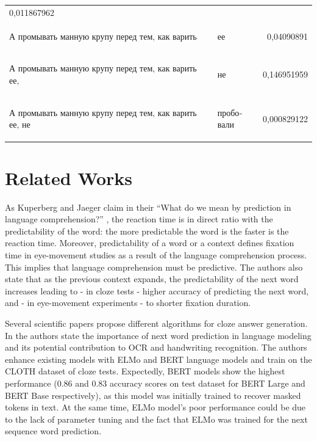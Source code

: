 \documentclass[a4paper]{article}
\begin{document}
\begin{table}
\begin{tabular}{llr}
0,011867962 \\
\begin{russian} А промывать манную крупу перед тем‚ как варить \end{russian} &
\begin{russian} ее \end{russian} &
0,04090891 \\
\begin{russian} А промывать манную крупу перед тем‚ как варить ее‚ \end{russian} &
\begin{russian} не \end{russian} &
0,146951959 \\
\begin{russian} А промывать манную крупу перед тем‚ как варить ее‚ не \end{russian} &
\begin{russian} пробовали \end{russian} &
0,000829122 \\
\end{tabular}
\end{table}

\section{Related Works}

As Kuperberg and Jaeger claim in their “What do we mean by prediction
in language comprehension?” \cite{kuperberg-jaeger}, the reaction time is in direct ratio with the predictability of the word: the more predictable the word is the faster is the reaction time. Moreover, predictability of a word or a context defines fixation time in eye-movement studies as a result of the language comprehension process. This implies that language comprehension must be predictive. The authors also state that as the previous context expands, the predictability of the next word increases leading to - in cloze tests - higher accuracy of predicting the next word, and - in eye-movement experiments - to shorter fixation duration.

Several scientific papers propose different algorithms for cloze answer generation. In \cite{zhou-cloze} the authors state the importance of next word prediction in language modeling and its potential contribution to OCR and handwriting recognition. The authors enhance existing models with ELMo and BERT language models and train on the CLOTH dataset of cloze tests. Expectedly, BERT models show the highest performance (0.86 and 0.83 accuracy scores on test dataset for BERT Large and BERT Base respectively), as this model was initially trained to recover masked tokens in text. At the same time, ELMo model's poor performance could be due to the lack of parameter tuning and the fact that ELMo was trained for the next sequence word prediction.
\end{document}
